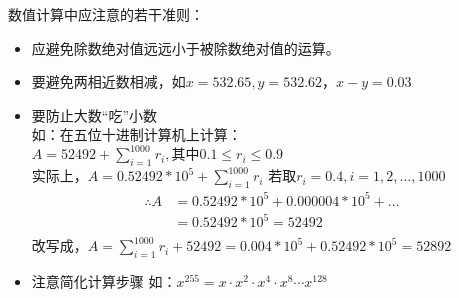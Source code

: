 \documentclass[a4paper]{article}
\begin{document}
数值计算中应注意的若干准则：
\begin{itemize}
\item 应避免除数绝对值远远小于被除数绝对值的运算。
\item 要避免两相近数相减，如$x=532.65, y=532.62$，$x-y = 0.03$
\item 要防止大数“吃”小数\\
 如：在五位十进制计算机上计算：\\
 $A=52492+\sum^{1000}_{i=1}r_i, 其中0.1 \le r_i \le 0.9$ \\
 实际上，$A=0.52492*10^5+\sum^{1000}_{i=1}r_i$
 若取$r_i=0.4, i = 1, 2, \dots, 1000$ \\
\begin{equation*}
 \begin{split}
\therefore  A &=0.52492*10^5 + 0.000004*10^5 + \dots \\
 &=0.52492*10^5 = 52492 \\
 \end{split}
\end{equation*}
改写成，$A=\sum^{1000}_{i=1}r_i+52492=0.004*10^5+0.52492*10^5=52892$
\item 注意简化计算步骤
如：$x^{255}=x\cdot x^2 \cdot x^4 \cdot x^8 \cdots x^{128}$
\end{itemize}
\end{document}
